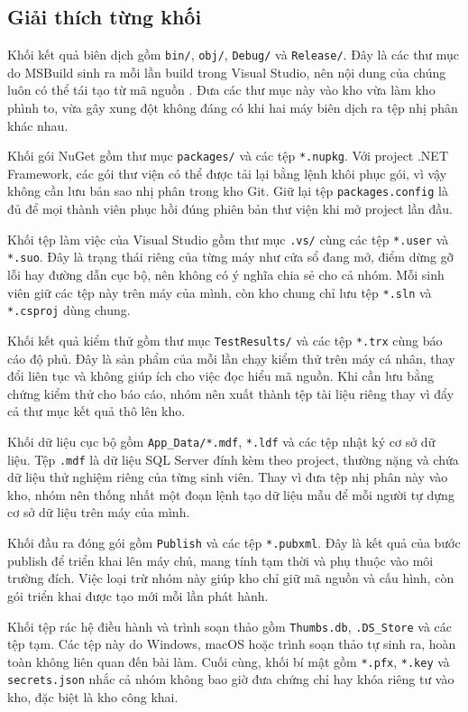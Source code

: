 \subsection{Giải thích từng khối}

Khối kết quả biên dịch gồm \verb|bin/|, \verb|obj/|, \verb|Debug/| và \verb|Release/|.
Đây là các thư mục do MSBuild sinh ra mỗi lần build trong Visual Studio, nên nội dung của chúng luôn có thể tái tạo từ mã nguồn \cite{msmsbuild}.
Đưa các thư mục này vào kho vừa làm kho phình to, vừa gây xung đột không đáng có khi hai máy biên dịch ra tệp nhị phân khác nhau.

Khối gói NuGet gồm thư mục \verb|packages/| và các tệp \verb|*.nupkg|.
Với project .NET Framework, các gói thư viện có thể được tải lại bằng lệnh khôi phục gói, vì vậy không cần lưu bản sao nhị phân trong kho Git.
Giữ lại tệp \verb|packages.config| là đủ để mọi thành viên phục hồi đúng phiên bản thư viện khi mở project lần đầu.

Khối tệp làm việc của Visual Studio gồm thư mục \verb|.vs/| cùng các tệp \verb|*.user| và \verb|*.suo|.
Đây là trạng thái riêng của từng máy như cửa sổ đang mở, điểm dừng gỡ lỗi hay đường dẫn cục bộ, nên không có ý nghĩa chia sẻ cho cả nhóm.
Mỗi sinh viên giữ các tệp này trên máy của mình, còn kho chung chỉ lưu tệp \verb|*.sln| và \verb|*.csproj| dùng chung.

Khối kết quả kiểm thử gồm thư mục \verb|TestResults/| và các tệp \verb|*.trx| cùng báo cáo độ phủ.
Đây là sản phẩm của mỗi lần chạy kiểm thử trên máy cá nhân, thay đổi liên tục và không giúp ích cho việc đọc hiểu mã nguồn.
Khi cần lưu bằng chứng kiểm thử cho báo cáo, nhóm nên xuất thành tệp tài liệu riêng thay vì đẩy cả thư mục kết quả thô lên kho.

Khối dữ liệu cục bộ gồm \verb|App_Data/*.mdf|, \verb|*.ldf| và các tệp nhật ký cơ sở dữ liệu.
Tệp \verb|.mdf| là dữ liệu SQL Server đính kèm theo project, thường nặng và chứa dữ liệu thử nghiệm riêng của từng sinh viên.
Thay vì đưa tệp nhị phân này vào kho, nhóm nên thống nhất một đoạn lệnh tạo dữ liệu mẫu để mỗi người tự dựng cơ sở dữ liệu trên máy của mình.

Khối đầu ra đóng gói gồm \verb|Publish| và các tệp \verb|*.pubxml|.
Đây là kết quả của bước publish để triển khai lên máy chủ, mang tính tạm thời và phụ thuộc vào môi trường đích.
Việc loại trừ nhóm này giúp kho chỉ giữ mã nguồn và cấu hình, còn gói triển khai được tạo mới mỗi lần phát hành.

Khối tệp rác hệ điều hành và trình soạn thảo gồm \verb|Thumbs.db|, \verb|.DS_Store| và các tệp tạm.
Các tệp này do Windows, macOS hoặc trình soạn thảo tự sinh ra, hoàn toàn không liên quan đến bài làm.
Cuối cùng, khối bí mật gồm \verb|*.pfx|, \verb|*.key| và \verb|secrets.json| nhắc cả nhóm không bao giờ đưa chứng chỉ hay khóa riêng tư vào kho, đặc biệt là kho công khai.

